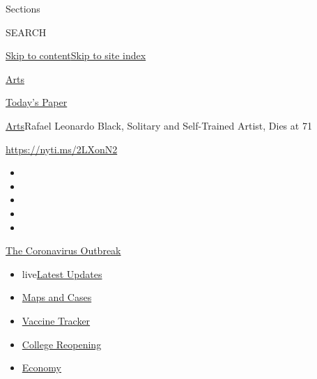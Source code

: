 Sections

SEARCH

\protect\hyperlink{site-content}{Skip to
content}\protect\hyperlink{site-index}{Skip to site index}

\href{https://www.nytimes3xbfgragh.onion/section/arts}{Arts}

\href{https://myaccount.nytimes3xbfgragh.onion/auth/login?response_type=cookie\&client_id=vi}{}

\href{https://www.nytimes3xbfgragh.onion/section/todayspaper}{Today's
Paper}

\href{/section/arts}{Arts}\textbar{}Rafael Leonardo Black, Solitary and
Self-Trained Artist, Dies at 71

\url{https://nyti.ms/2LXonN2}

\begin{itemize}
\item
\item
\item
\item
\item
\end{itemize}

\href{https://www.nytimes3xbfgragh.onion/news-event/coronavirus?action=click\&pgtype=Article\&state=default\&region=TOP_BANNER\&context=storylines_menu}{The
Coronavirus Outbreak}

\begin{itemize}
\tightlist
\item
  live\href{https://www.nytimes3xbfgragh.onion/2020/08/04/world/coronavirus-covid-19.html?action=click\&pgtype=Article\&state=default\&region=TOP_BANNER\&context=storylines_menu}{Latest
  Updates}
\item
  \href{https://www.nytimes3xbfgragh.onion/interactive/2020/us/coronavirus-us-cases.html?action=click\&pgtype=Article\&state=default\&region=TOP_BANNER\&context=storylines_menu}{Maps
  and Cases}
\item
  \href{https://www.nytimes3xbfgragh.onion/interactive/2020/science/coronavirus-vaccine-tracker.html?action=click\&pgtype=Article\&state=default\&region=TOP_BANNER\&context=storylines_menu}{Vaccine
  Tracker}
\item
  \href{https://www.nytimes3xbfgragh.onion/2020/08/02/us/covid-college-reopening.html?action=click\&pgtype=Article\&state=default\&region=TOP_BANNER\&context=storylines_menu}{College
  Reopening}
\item
  \href{https://www.nytimes3xbfgragh.onion/live/2020/08/03/business/stock-market-today-coronavirus?action=click\&pgtype=Article\&state=default\&region=TOP_BANNER\&context=storylines_menu}{Economy}
\end{itemize}

